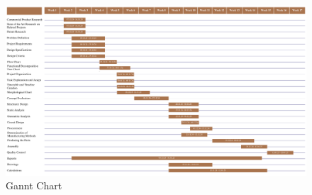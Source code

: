 \documentclass[12pt]{article}
\begin{document}
\begin{figure}
    \centering
    \includegraphics[angle=90, width=\linewidth, height=1.5\linewidth]{Ekran Resmi 2024-11-15 20.07.48.png}
    \caption{Gannt Chart}
    \label{fig:gannt}
\end{figure}
\end{document}
